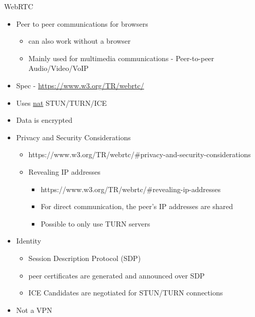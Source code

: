 \label{notes__02170-webrtc.md}
\begin{block}{WebRTC}
\label{notes__02170-webrtc.md__webrtc}
\begin{itemize}
\tightlist
\item
  Peer to peer communications for browsers

  \begin{itemize}
  \tightlist
  \item
    can also work without a browser
  \item
    Mainly used for multimedia communications - Peer-to-peer Audio/Video/VoIP
  \end{itemize}
\item
  Spec - \href{https://www.w3.org/TR/webrtc/\#persistent-information-exposed-by-webrtc}{https://www.w3.org/TR/webrtc/}
\item
  Uses \hyperlink{notes__02021-internet-protocol.md}{nat} STUN/TURN/ICE
\item
  Data is encrypted
\item
  Privacy and Security Considerations

  \begin{itemize}
  \tightlist
  \item
    https://www.w3.org/TR/webrtc/\#privacy-and-security-considerations
  \item
    Revealing IP addresses

    \begin{itemize}
    \tightlist
    \item
      https://www.w3.org/TR/webrtc/\#revealing-ip-addresses
    \item
      For direct communication, the peer's IP addresses are shared
    \item
      Possible to only use TURN servers
    \end{itemize}
  \end{itemize}
\item
  Identity

  \begin{itemize}
  \tightlist
  \item
    Session Description Protocol (SDP)
  \item
    peer certificates are generated and announced over SDP
  \item
    ICE Candidates are negotiated for STUN/TURN connections
  \end{itemize}
\item
  Not a VPN


\end{itemize}
\end{block}
